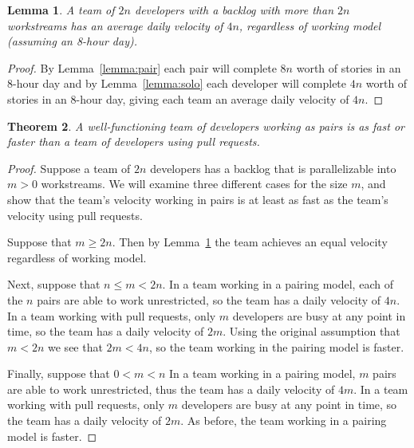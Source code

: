 \documentclass[letterpaper]{article}
\newtheorem{theorem}{Theorem}[section]
\newtheorem{lemma}[theorem]{Lemma}
\theoremstyle{definition}
\begin{document}
    \begin{lemma}
        \label{lemma:parallel}
        A team of $2n$ developers with a backlog with more than $2n$ workstreams has an average daily velocity of $4n$,
        regardless of working model (assuming an 8-hour day).
    \end{lemma}
    \begin{proof}
        By Lemma~\ref{lemma:pair} each pair will complete $8n$ worth of stories in an 8-hour day and by
        Lemma~\ref{lemma:solo} each developer will complete $4n$ worth of stories in an 8-hour day, giving each team an
        average daily velocity of $4n$.
    \end{proof}

    \begin{theorem}
        A well-functioning team of developers working as pairs is as fast or faster than a team of developers using pull
        requests.
    \end{theorem}
    \begin{proof}
        Suppose a team of $2n$ developers has a backlog that is parallelizable into $m > 0$ workstreams.
        We will examine three different cases for the size $m$, and show that the team's velocity working in pairs is at
        least as fast as the team's velocity using pull requests.

        Suppose that $m\geq 2n$.
        Then by Lemma~\ref{lemma:parallel} the team achieves an equal velocity regardless of working model.

        Next, suppose that $n\leq m < 2n$.
        In a team working in a pairing model, each of the $n$ pairs are able to work unrestricted, so the team has a
        daily velocity of $4n$.
        In a team working with pull requests, only $m$ developers are busy at any point in time, so the team has a daily
        velocity of $2m$.
        Using the original assumption that $m < 2n$ we see that $2m < 4n$, so the team working in the pairing model is
        faster.

        Finally, suppose that $0 < m < n$
        In a team working in a pairing model, $m$ pairs are able to work unrestricted, thus the team has a daily
        velocity of $4m$.
        In a team working with pull requests, only $m$ developers are busy at any point in time, so the team has a daily
        velocity of $2m$.
        As before, the team working in a pairing model is faster.
    \end{proof}
\end{document}
